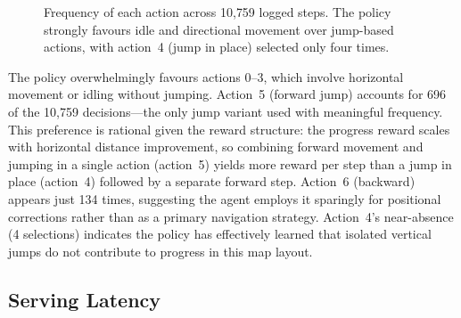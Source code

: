\documentclass[11pt]{article}
\begin{document}
\begin{figure}[htbp]
  \centering
  \caption{Frequency of each action across 10{,}759 logged steps. The
    policy strongly favours idle and directional movement over
    jump-based actions, with action~4 (jump in place) selected only
    four times.}
  \label{fig:actions}
\end{figure}

The policy overwhelmingly favours actions 0--3, which involve
horizontal movement or idling without jumping. Action~5 (forward jump)
accounts for 696 of the 10{,}759 decisions---the only jump variant
used with meaningful frequency. This preference is rational given the
reward structure: the progress reward scales with horizontal distance
improvement, so combining forward movement and jumping in a single action
(action~5) yields more reward per step than a jump in place (action~4)
followed by a separate forward step. Action~6 (backward) appears just
134 times, suggesting the agent employs it sparingly for positional
corrections rather than as a primary navigation strategy. Action~4's
near-absence (4 selections) indicates the policy has effectively learned
that isolated vertical jumps do not contribute to progress in this map
layout.

\subsection{Serving Latency}
\end{document}
